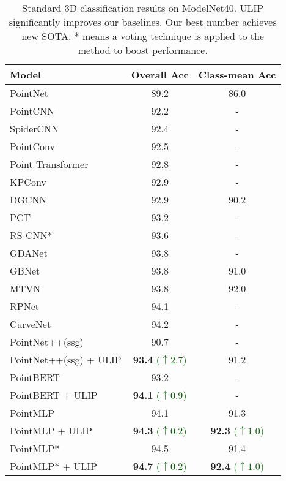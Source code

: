 \begin{table}[htb]
    \small
    \centering
    \begin{tabular}{lcc}
    \toprule
         Model  &  Overall Acc & Class-mean Acc\\
         \midrule
         PointNet \cite{qi2017pointnet}  & 89.2 & 86.0 \\
         PointCNN \cite{li2018pointcnn}  & 92.2 & -\\
         SpiderCNN \cite{xu2018spidercnn} & 92.4 & -\\
         PointConv \cite{wu2019pointconv} & 92.5 & -\\
         Point Transformer \cite{zhao2021point} & 92.8 & -\\
         KPConv \cite{thomas2019kpconv} & 92.9 & -\\
         DGCNN \cite{wang2019dynamic}  & 92.9 & 90.2 \\
         PCT \cite{guo2021pct}  & 93.2 & -\\
         RS-CNN* \cite{liu2019relation}  & 93.6 & -\\
         GDANet \cite{xu2021learning}  & 93.8 & -\\
         GBNet \cite{qiu2021geometric}  & 93.8 & 91.0 \\
         MTVN \cite{hamdi2021mvtn}  & 93.8 & 92.0 \\
         RPNet \cite{ran2021learning} & 94.1 & -\\
         CurveNet \cite{xiang2021walk} & 94.2 &- \\
         \midrule
         PointNet++(ssg) & 90.7 & -\\
         PointNet++(ssg) + ULIP & \textbf{93.4} \textcolor{DarkGreen}{\small ($\uparrow 2.7$)} & 91.2 \\
         \midrule
         PointBERT  & 93.2 &  -\\
        PointBERT + ULIP & \textbf{94.1} \textcolor{DarkGreen}{\small ($\uparrow 0.9$)} & - \\
         \midrule
         PointMLP  & 94.1 & 91.3 \\
         PointMLP + ULIP  &  \textbf{94.3} \textcolor{DarkGreen}{\small ($\uparrow 0.2$)} & \textbf{92.3} \textcolor{DarkGreen}{\small ($\uparrow 1.0$)} \\
         \midrule
         PointMLP*  &  94.5 & 91.4 \\
        PointMLP* + ULIP  &  \textbf{94.7} \textcolor{DarkGreen}{\small ($\uparrow 0.2$)} & \textbf{92.4} \textcolor{DarkGreen}{\small ($\uparrow 1.0$)}\\
         \bottomrule
    \end{tabular}
    \caption{Standard 3D classification results on ModelNet40. ULIP significantly improves our baselines. Our best number achieves new SOTA. * means a voting technique is applied to the method to boost performance.}
    \label{tab:fintune-modelnet}
    \vspace{-4mm}
\end{table}

